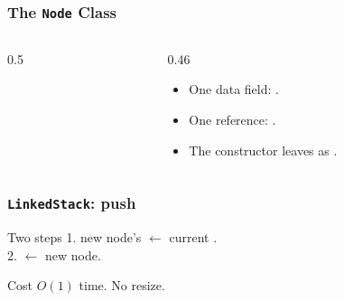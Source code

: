 \documentclass[aspectratio=169,10pt,compress]{beamer}
\begin{document}

\begin{frame}[t,fragile]\frametitle{The \texttt{Node} Class}
  \begin{columns}[T]
    \begin{column}{0.5\textwidth}
    \end{column}
    \begin{column}{0.46\textwidth}
      \begin{itemize}\small
        \item One data field: .
        \item One reference: .
        \item The constructor leaves  as .
      \end{itemize}
    \end{column}
  \end{columns}
\end{frame}

\begin{frame}[t,fragile]\frametitle{\texttt{LinkedStack}: push}
      \begin{block}{Two steps}
        \small
        1. new node's  $\gets$ current .\\
        2.  $\gets$ new node.
      \end{block}
      \begin{block}{Cost}
        \small
        $O(1)$ time. No resize.
      \end{block}
\end{frame}
\end{document}
